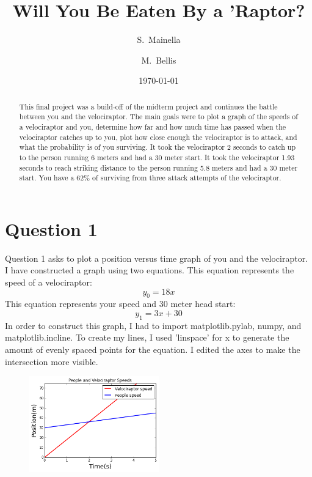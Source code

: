 \documentclass[twocolumn]{revtex4}
\begin{document}
\title{ Will You Be Eaten By a 'Raptor?
}

\author{S.~Mainella}
\author{M.~Bellis}

\date{\today}

\begin{abstract}
   This final project was a build-off of the midterm project and continues the battle between you and the velociraptor. The main goals were to plot a graph of the speeds of a velociraptor and you, determine how far and how much time has passed when the velociraptor catches up to you, plot how close enough the velociraptor is to attack, and what the probability is of you surviving. It took the velociraptor 2 seconds to catch up to the person running 6 meters and had a 30 meter start. It took the velociraptor 1.93 seconds to reach striking distance to the person running 5.8 meters and had a 30 meter start. You have a 62\% of surviving from three attack attempts of the velociraptor.
\end{abstract}

\maketitle

\section{Question 1}
\centering
    Question 1 asks to plot a position versus time graph of you and the velociraptor. I have constructed a graph using two equations. This equation represents the speed of a velociraptor:
     $$y_0=18x$$
     This equation represents your speed and 30 meter head start:
     $$y_1=3x+30$$
     In order to construct this graph, I had to import matplotlib.pylab, numpy, and matplotlib.incline. To create my lines, I used 'linspace' for x to generate the amount of evenly spaced points for the equation. I edited the axes to make the intersection more visible.

\begin{figure}[h!]
\includegraphics[width=0.5\textwidth]{v1.png}



\end{figure}
\pagebreak
\end{document}
